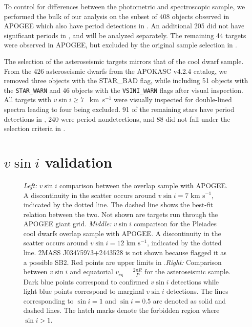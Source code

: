 \documentclass[manuscript]{aastex6}
\newcommand{\vsini}{\ensuremath{v \sin i}}
\newcommand{\kms}{\textrm{~km~s}\ensuremath{^{-1}}}
\newcommand{\STARWARN}{\texttt{STAR\_WARN}}
\newcommand{\VSINIWARN}{\texttt{VSINI\_WARN}}
\begin{document}
To control for differences between the photometric and spectroscopic sample,
we performed the bulk of our analysis on the subset of 408 objects
observed in APOGEE which also have period detections in \citet{McQuillan14}.
An additional 205 did not have significant periods in \citet{McQuillan14}, and
will be analyzed separately. The remaining 44 targets were observed in APOGEE,
but excluded by the original sample selection in \citet{McQuillan14}. 

The selection of the asteroseismic targets mirrors that of the cool dwarf
sample. From the 426 asteroseismic dwarfs from the APOKASC v4.2.4 catalog, we 
removed three objects with the STAR\_BAD flag, while including 51 objects with 
the \STARWARN{} and 46 objects with the \VSINIWARN{} flags after visual 
inspection. All targets with \(\vsini \ge 7\) \kms{} were visually
inspected for double-lined spectra leading to four being excluded. 91 of 
the remaining stars have period detections in \citet{McQuillan14}, 240 were 
period nondetections, and 88 did not fall under the selection criteria in 
\citet{McQuillan14}. 

\section{\vsini{} validation}
\label{sec:vsini_check}

\begin{figure*}
    \caption{\emph{Left:} \vsini{} comparison between the \citet{Bruntt12}
        overlap sample with APOGEE\@. A discontinuity in the scatter occurs
        around \(\vsini = 7 \kms\), indicated by the dotted line. The dashed
    line shows the best-fit relation between the two. Not shown are targets 
    run through the APOGEE giant grid. \emph{Middle:} \vsini{} comparison for 
    the Pleiades cool dwarfs \citep{Stauffer87} overlap sample with APOGEE\@. 
    A discontinuity in the scatter occurs around \(\vsini = 12 \kms\), 
    indicated by the dotted line. 2MASS J03475973+2443528 is not shown
    because \citet{Stauffer87} flagged it as a possible SB2. Red points are 
    upper limits in \citet{Stauffer87}.\emph{Right:} Comparison between
    \vsini{} and equatorial \(v_{eq} = \frac{2\pi R}{P}\) for the 
    asteroseismic sample. Dark blue points correspond to confirmed
    \vsini{} detections while light blue points correspond to marginal
    \vsini{} detections. The lines corresponding to \(\sin i = 1\) and
    \(\sin i = 0.5\) are denoted as solid and dashed lines. The hatch
    marks denote the forbidden region where \(\sin i > 1\).\label{fig:comps}}
\end{figure*}
\end{document}
